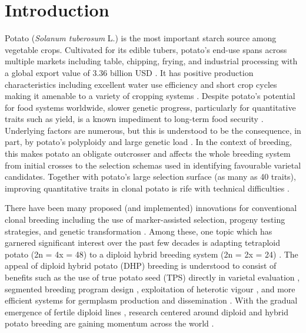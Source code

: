 \newpage


\section{Introduction}

Potato (\textit{Solanum tuberosum} L.) is the most important starch source among vegetable crops. Cultivated for its edible tubers, potato's end-use spans across multiple markets including table, chipping, frying, and industrial processing with a global export value of 3.36 billion USD \cite{fao2023}. It has positive production characteristics including excellent water use efficiency and short crop cycles making it amenable to a variety of cropping systems \cite{Haverkort1990}. Despite potato's potential for food systems worldwide, slower genetic progress, particularly for quantitative traits such as yield, is a known impediment to long-term food security \cite{Douches1996}. Underlying factors are numerous, but this is understood to be the consequence, in part, by potato's polyploidy and large genetic load \cite{Lian2019}. In the context of breeding, this makes potato an obligate outcrosser and affects the whole breeding system from initial crosses to the selection schemas used in identifying favourable varietal candidates. Together with potato's large selection surface (as many as 40 traits), improving quantitative traits in clonal potato is rife with technical difficulties \cite{Gebhardt2013, Gopal2015}.  

There have been many proposed (and implemented) innovations for conventional clonal breeding including the use of marker-assisted selection, progeny testing strategies, and genetic transformation  \cite{Bradshaw2022}. Among these, one topic which has garnered significant interest over the past few decades is adapting tetraploid potato (2n = 4x = 48) to a diploid hybrid breeding system (2n = 2x = 24) \cite{Lindhout2011, Jansky2016}. The appeal of diploid hybrid potato (DHP) breeding is understood to consist of benefits such as the use of true potato seed (TPS) directly in varietal evaluation \cite{VanDijk2021}, segmented breeding program design \cite{Technow2021}, exploitation of heterotic vigour \cite{Technow2012}, and more efficient systems for germplasm production and dissemination \cite{Pallais1991}. With the gradual emergence of fertile diploid lines \cite{Eggers2021, Ma2021}, research centered around diploid and hybrid potato breeding are gaining momentum across the world \cite{Lindhout2018, Bethke2022, Jansky2016, Zhang2021}. 

